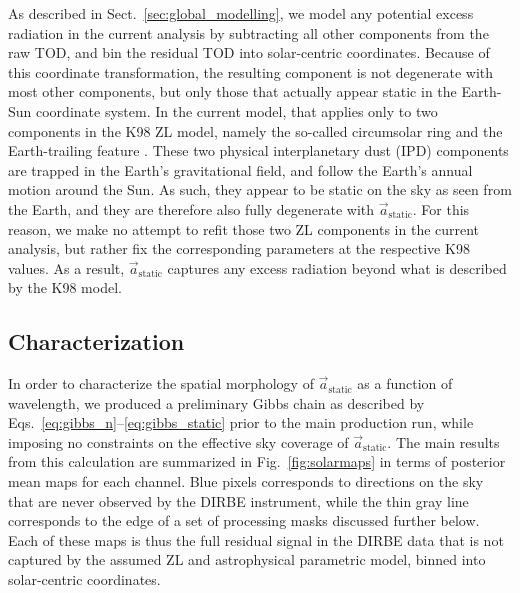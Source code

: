 \documentclass{aa}
\renewcommand{\a}[0]{\vec{a}}
\begin{document}
As described in Sect.~\ref{sec:global_modelling}, we model any
potential excess radiation in the current analysis by subtracting all
other components from the raw TOD, and bin the residual TOD into
solar-centric coordinates. Because of this coordinate transformation,
the resulting component is not degenerate with most other components,
but only those that actually appear static in the Earth-Sun coordinate
system. In the current model, that applies only to two components in the
K98 ZL model, namely the so-called circumsolar ring and the
Earth-trailing feature \citep{kelsall1998}. These two physical
interplanetary dust (IPD) components are trapped in the Earth's
gravitational field, and follow the Earth's annual motion around the
Sun. As such, they appear to be static on the sky as seen from the
Earth, and they are therefore also fully degenerate with
$\a_{\mathrm{static}}$. For this reason, we make no attempt to refit
those two ZL components in the current analysis, but rather fix the
corresponding parameters at the respective K98 values. As a result,
$\a_{\mathrm{static}}$ captures any excess radiation beyond what is
described by the K98 model.

\subsection{Characterization}

In order to characterize the spatial morphology of
$\a_{\mathrm{static}}$ as a function of wavelength, we produced a
preliminary Gibbs chain as described by
Eqs.~\eqref{eq:gibbs_n}--\eqref{eq:gibbs_static} prior to the main
production run, while imposing no constraints on the effective sky
coverage of $\a_{\mathrm{static}}$. The main results from this
calculation are summarized in Fig.~\ref{fig:solarmaps} in terms of
posterior mean maps for each channel. Blue pixels corresponds to
directions on the sky that are never observed by the DIRBE instrument,
while the thin gray line corresponds to the edge of a set of
processing masks discussed further below. Each of these maps is thus
the full residual signal in the DIRBE data that is not
captured by the assumed ZL and astrophysical parametric model, binned
into solar-centric coordinates.
\end{document}
